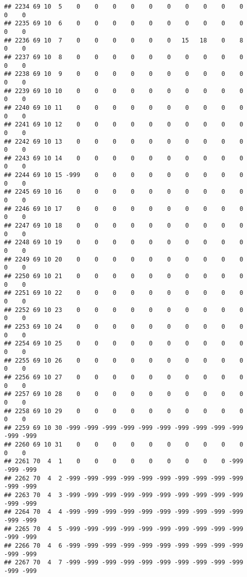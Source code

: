 \documentclass[]{article}
\begin{document}
\begin{verbatim}
## 2234 69 10  5    0    0    0    0    0    0    0    0    0    0    0    0
## 2235 69 10  6    0    0    0    0    0    0    0    0    0    0    0    0
## 2236 69 10  7    0    0    0    0    0    0   15   18    0    8    0    0
## 2237 69 10  8    0    0    0    0    0    0    0    0    0    0    0    0
## 2238 69 10  9    0    0    0    0    0    0    0    0    0    0    0    0
## 2239 69 10 10    0    0    0    0    0    0    0    0    0    0    0    0
## 2240 69 10 11    0    0    0    0    0    0    0    0    0    0    0    0
## 2241 69 10 12    0    0    0    0    0    0    0    0    0    0    0    0
## 2242 69 10 13    0    0    0    0    0    0    0    0    0    0    0    0
## 2243 69 10 14    0    0    0    0    0    0    0    0    0    0    0    0
## 2244 69 10 15 -999    0    0    0    0    0    0    0    0    0    0    0
## 2245 69 10 16    0    0    0    0    0    0    0    0    0    0    0    0
## 2246 69 10 17    0    0    0    0    0    0    0    0    0    0    0    0
## 2247 69 10 18    0    0    0    0    0    0    0    0    0    0    0    0
## 2248 69 10 19    0    0    0    0    0    0    0    0    0    0    0    0
## 2249 69 10 20    0    0    0    0    0    0    0    0    0    0    0    0
## 2250 69 10 21    0    0    0    0    0    0    0    0    0    0    0    0
## 2251 69 10 22    0    0    0    0    0    0    0    0    0    0    0    0
## 2252 69 10 23    0    0    0    0    0    0    0    0    0    0    0    0
## 2253 69 10 24    0    0    0    0    0    0    0    0    0    0    0    0
## 2254 69 10 25    0    0    0    0    0    0    0    0    0    0    0    0
## 2255 69 10 26    0    0    0    0    0    0    0    0    0    0    0    0
## 2256 69 10 27    0    0    0    0    0    0    0    0    0    0    0    0
## 2257 69 10 28    0    0    0    0    0    0    0    0    0    0    0    0
## 2258 69 10 29    0    0    0    0    0    0    0    0    0    0    0    0
## 2259 69 10 30 -999 -999 -999 -999 -999 -999 -999 -999 -999 -999 -999 -999
## 2260 69 10 31    0    0    0    0    0    0    0    0    0    0    0    0
## 2261 70  4  1    0    0    0    0    0    0    0    0    0 -999 -999 -999
## 2262 70  4  2 -999 -999 -999 -999 -999 -999 -999 -999 -999 -999 -999 -999
## 2263 70  4  3 -999 -999 -999 -999 -999 -999 -999 -999 -999 -999 -999 -999
## 2264 70  4  4 -999 -999 -999 -999 -999 -999 -999 -999 -999 -999 -999 -999
## 2265 70  4  5 -999 -999 -999 -999 -999 -999 -999 -999 -999 -999 -999 -999
## 2266 70  4  6 -999 -999 -999 -999 -999 -999 -999 -999 -999 -999 -999 -999
## 2267 70  4  7 -999 -999 -999 -999 -999 -999 -999 -999 -999 -999 -999 -999

\end{verbatim}
\end{document}
